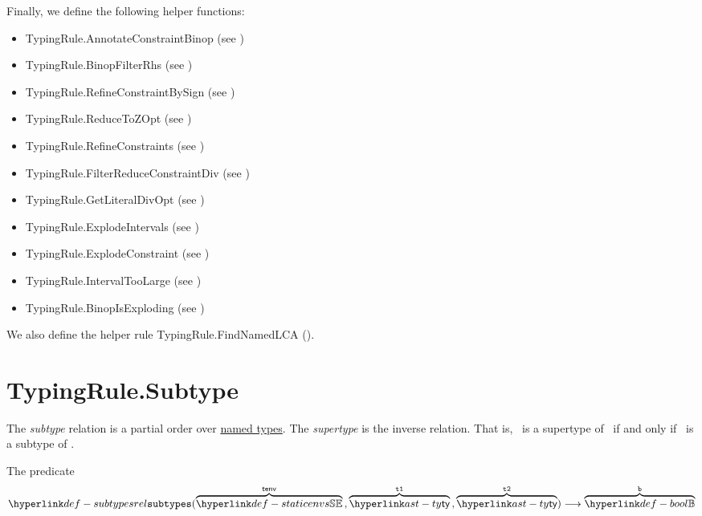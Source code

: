 Finally, we define the following helper functions:
\begin{itemize}
  \item TypingRule.AnnotateConstraintBinop (see )
  \item TypingRule.BinopFilterRhs (see )
  \item TypingRule.RefineConstraintBySign (see )
  \item TypingRule.ReduceToZOpt (see )
  \item TypingRule.RefineConstraints (see )
  \item TypingRule.FilterReduceConstraintDiv (see )
  \item TypingRule.GetLiteralDivOpt (see )
  \item TypingRule.ExplodeIntervals (see )
  \item TypingRule.ExplodeConstraint (see )
  \item TypingRule.IntervalTooLarge (see )
  \item TypingRule.BinopIsExploding (see )
\end{itemize}

We also define the helper rule TypingRule.FindNamedLCA ().

\section{TypingRule.Subtype\label{sec:TypingRule.Subtype}}
The \emph{subtype} relation is a partial order over \underline{named types}.
The \emph{supertype} is the inverse relation. That is, \tty\ is a supertype of \tsy\ if and only if \tsy\ is a subtype of \tty.

\hypertarget{def-subtypesrel}{}
The predicate
\[
  \subtypesrel(\overname{\staticenvs}{\tenv} \aslsep \overname{\ty}{\vtone} \aslsep \overname{\ty}{\vttwo})
  \aslto \overname{\Bool}{\vb}
\]

